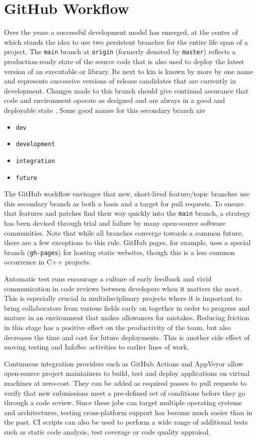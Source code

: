 \section{GitHub Workflow}

Over the years a successful development model has emerged, at the center of which
stands the idea to use two persistent branches for the entire life span of a project.
The \texttt{main} branch at \texttt{origin} (formerly denoted by \texttt{master})
reflects a production-ready state of the source code that is also used to deploy
the latest version of an executable or library. Its next to kin is known by more
by one name and represents successive versions of release candidates that are
currently in development. Changes made to this branch should give continual assurance
that code and environment operate as designed and are always in a good and deployable
state \autocite{devops2016}. Some good names for this secondary branch are

\begin{itemize}
    \item \texttt{dev}
    \item \texttt{development}
    \item \texttt{integration}
    \item \texttt{future}
\end{itemize}

The GitHub workflow envisages that new, short-lived feature/topic branches use
this secondary branch as both a basis and a target for pull requests. To ensure
that features and patches find their way quickly into the \texttt{main} branch,
a strategy has been devised through trial and failure by many open-source software
communities. Note that while all branches converge towards a common future, there
are a few exceptions to this rule. GitHub pages, for example, uses a special branch
(\texttt{gh-pages}) for hosting static websites, though this is a less common
occurrence in C++ projects.

Automatic test runs encourage a culture of early feedback and vivid communication
in code reviews between developers when it matters the most. This is especially
crucial in multidisciplinary projects where it is important to bring collaborators
from various fields early on together in order to progress and mature in an environment
that makes allowances for mistakes. Reducing friction in this stage has a positive
effect on the productivity of the team, but also decreases the time and cost for
future deployments. This is another side effect of moving testing and InfoSec
activities to earlier lines of work.

Continuous integration providers such as GitHub Actions and AppVeyor allow open-source
project maintainers to build, test and deploy applications on virtual machines at
zero-cost. They can be added as required passes to pull requests to verify that
new submissions meet a pre-defined set of conditions before they go through a code
review. Since these jobs can target multiple operating systems and architectures,
testing cross-platform support has become much easier than in the past. CI scripts
can also be used to perform a wide range of additional tests such as static code
analysis, test coverage or code quality appraisal.
